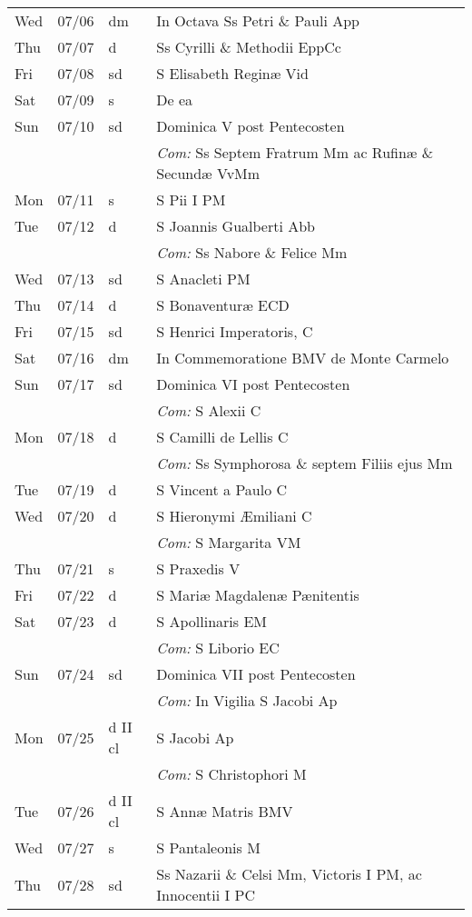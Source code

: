 \documentclass[10pt]{article}
\begin{document}
\begin{longtable}{ l l l l }
Wed & 07/06 & dm & In Octava Ss Petri \& Pauli App\\
Thu & 07/07 & d & Ss Cyrilli \& Methodii EppCc\\
Fri & 07/08 & sd & S Elisabeth Reginæ Vid\\
Sat & 07/09 & s & De ea\\
Sun & 07/10 & sd & Dominica V post Pentecosten\\
 & & & \textit{Com:} Ss Septem Fratrum Mm ac Rufinæ \& Secundæ VvMm\\
Mon & 07/11 & s & S Pii I PM\\
Tue & 07/12 & d & S Joannis Gualberti Abb\\
 & & & \textit{Com:} Ss Nabore \& Felice Mm\\
Wed & 07/13 & sd & S Anacleti PM\\
Thu & 07/14 & d & S Bonaventuræ ECD\\
Fri & 07/15 & sd & S Henrici Imperatoris, C\\
Sat & 07/16 & dm & In Commemoratione BMV de Monte Carmelo\\
Sun & 07/17 & sd & Dominica VI post Pentecosten\\
 & & & \textit{Com:} S Alexii C\\
Mon & 07/18 & d & S Camilli de Lellis C\\
 & & & \textit{Com:} Ss Symphorosa \& septem Filiis ejus Mm\\
Tue & 07/19 & d & S Vincent a Paulo C\\
Wed & 07/20 & d & S Hieronymi Æmiliani C\\
 & & & \textit{Com:} S Margarita VM\\
Thu & 07/21 & s & S Praxedis V\\
Fri & 07/22 & d & S Mariæ Magdalenæ Pænitentis\\
Sat & 07/23 & d & S Apollinaris EM\\
 & & & \textit{Com:} S Liborio EC\\
Sun & 07/24 & sd & Dominica VII post Pentecosten\\
 & & & \textit{Com:} In Vigilia S Jacobi Ap\\
Mon & 07/25 & d II cl & S Jacobi Ap\\
 & & & \textit{Com:} S Christophori M\\
Tue & 07/26 & d II cl & S Annæ Matris BMV\\
Wed & 07/27 & s & S Pantaleonis M\\
Thu & 07/28 & sd & Ss Nazarii \& Celsi Mm, Victoris I PM, ac Innocentii I PC\\

\end{longtable}
\end{document}
